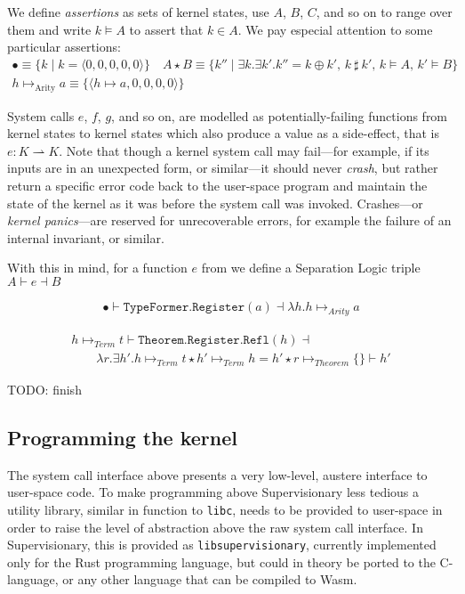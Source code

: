 \documentclass[a4paper, UKenglish, cleveref, autoref, thm-restate, colorlinks]{lipics-v2021}
\newcommand{\todo}[1]{}
\renewcommand{\todo}[1]{{\color{red} TODO: {#1}}}
\newcommand{\lam}[1]{\lambda{#1}.}
\newcommand{\xsts}[1]{\exists{#1}.}
\begin{document}
We define \emph{assertions} as sets of kernel states, use $A$, $B$, $C$, and so on to range over them and write $k \vDash A$ to assert that $k \in A$.
We pay especial attention to some particular assertions:
\begin{gather*}
\bullet \equiv \{ k \mid k = \langle 0, 0, 0, 0, 0 \rangle \}
\quad
A \star B \equiv \{ k'' \mid \xsts{k}\xsts{k'} k'' = k \oplus k' \text{, } k\ \sharp\ k' \text{, } k \vDash A \text{, } k' \vDash B \}
\\[0.5ex]
h \mapsto_{\text{Arity}} a \equiv \{ \langle h \mapsto a, 0, 0, 0, 0 \rangle \}
\end{gather*}

System calls $e$, $f$, $g$, and so on, are modelled as potentially-failing functions from kernel states to kernel states which also produce a value as a side-effect, that is $e : K \rightharpoonup K$.
Note that though a kernel system call may fail---for example, if its inputs are in an unexpected form, or similar---it should never \emph{crash}, but rather return a specific error code back to the user-space program and maintain the state of the kernel as it was before the system call was invoked.
Crashes---or \emph{kernel panics}---are reserved for unrecoverable errors, for example the failure of an internal invariant, or similar.

With this in mind, for a function $e$ from we define a Separation Logic triple $A \vdash e \dashv B$

\begin{gather*}
\bullet \vdash \mathtt{TypeFormer.Register}(a) \dashv \lam{h}h \mapsto_{Arity} a
\end{gather*}

\begin{gather*}
h \mapsto_{Term} t \vdash \mathtt{Theorem.Register.Refl}(h) \dashv \\
\qquad \lam{r}\xsts{h'}h \mapsto_{Term} t \star h' \mapsto_{Term} h = h' \star r \mapsto_{Theorem} \{\} \vdash h'
\end{gather*}

\todo{finish}

\subsection{Programming the kernel}

The system call interface above presents a very low-level, austere interface to user-space code.
To make programming above Supervisionary less tedious a utility library, similar in function to \texttt{libc}, needs to be provided to user-space in order to raise the level of abstraction above the raw system call interface.
In Supervisionary, this is provided as \texttt{libsupervisionary}, currently implemented only for the Rust programming language, but could in theory be ported to the C-language, or any other language that can be compiled to Wasm.
\end{document}
